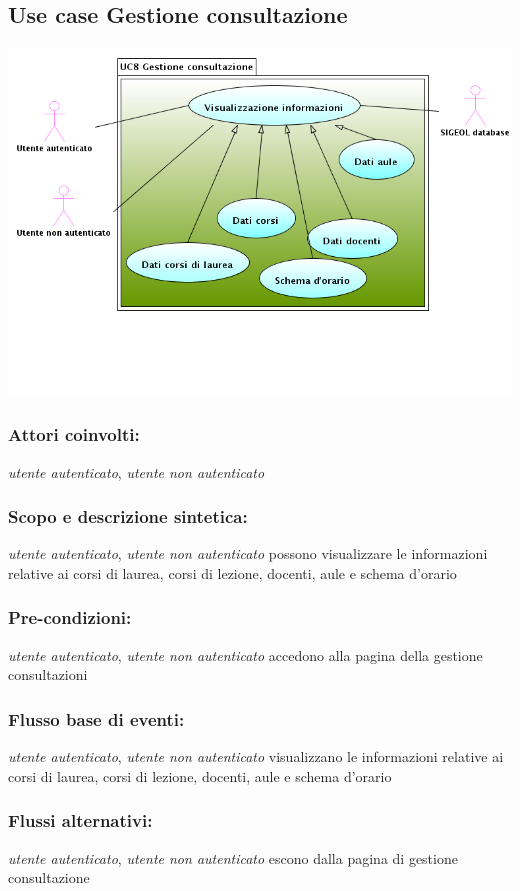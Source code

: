 \documentclass[11pt,a4paper]{article}
\begin{document}
\subsection{Use case Gestione consultazione}
\begin{center} 
 \includegraphics[scale=0.5]{images/UseCaseGestioneConsultazione.png}
\end{center}
\subsubsection*{Attori coinvolti:}
\textit{utente autenticato}, \textit{utente non autenticato}
\subsubsection*{Scopo e descrizione sintetica:}
\textit{utente autenticato}, \textit{utente non autenticato} possono visualizzare le informazioni relative ai corsi di laurea, corsi di lezione, docenti, aule e schema d'orario
\subsubsection*{Pre-condizioni:}
\textit{utente autenticato}, \textit{utente non autenticato} accedono alla pagina della gestione consultazioni
\subsubsection*{Flusso base di eventi:}
\textit{utente autenticato}, \textit{utente non autenticato} visualizzano le informazioni relative ai corsi di laurea, corsi di lezione, docenti, aule e schema d'orario
\subsubsection*{Flussi alternativi:}
 \textit{utente autenticato}, \textit{utente non autenticato} escono dalla pagina di gestione consultazione
\end{document}

